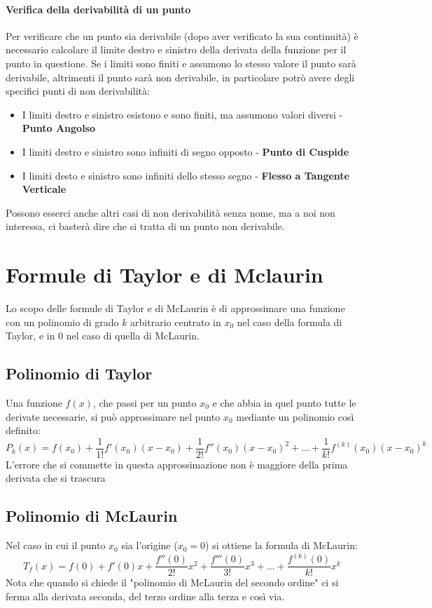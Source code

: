 \paragraph*{Verifica della derivabilità di un punto} Per verificare che un punto sia derivabile 
(dopo aver verificato la sua continuità) è necessario calcolare il limite destro e sinistro della derivata della funzione per il punto in questione.
Se i limiti sono finiti e assumono lo stesso valore il punto sarà derivabile, altrimenti il punto sarà non derivabile, in particolare potrò avere
degli specifici punti di non derivabilità:
\begin{itemize}
	\item I limiti destro e sinistro esistono e sono finiti, ma assumono valori diversi - \textbf{Punto Angolso}
	\item I limiti destro e sinistro sono infiniti di segno opposto - \textbf{Punto di Cuspide}
	\item I limiti desto e sinistro sono infiniti dello stesso segno - \textbf{Flesso a Tangente Verticale}
\end{itemize}
Possono esserci anche altri casi di non derivabilità senza nome, ma a noi non interessa, ci basterà dire che si tratta di un punto non derivabile.

\section{Formule di Taylor e di Mclaurin}
Lo scopo delle formule di Taylor e di McLaurin è di approssimare una funzione con un polinomio di grado $k$ arbitrario centrato in $x_0$ nel caso della formula di Taylor,
e in 0 nel caso di quella di McLaurin.
\subsection*{Polinomio di Taylor}
Una funzione $f(x)$, che passi per un punto $x_0$ e che abbia in quel punto tutte le derivate necessarie,
si può approssimare nel punto $x_0$ mediante un polinomio così definito:
$$P_k(x)=f(x_0)+\frac{1}{1!}f'(x_0)(x-x_0) + \frac{1}{2!}f''(x_0)(x-x_0)^2 +... + \frac{1}{k!}f^{(k)}(x_0)(x-x_0)^k$$
L'errore che si commette in questa approssimazione non è maggiore della prima derivata che si trascura
\subsection*{Polinomio di McLaurin}
Nel caso in cui il punto $x_0$ sia l'origine ($x_0=0$) si ottiene la formula di McLaurin:
$$T_f(x) = f(0) + f'(0)x + \frac{f''(0)}{2!}x^2 + \frac{f'''(0)}{3!}x^3+...+ \frac{f^{(k)}(0)}{k!}x^k$$
Nota che quando si chiede il "polinomio di McLaurin del secondo ordine" ci si ferma alla derivata seconda, del terzo ordine alla terza e così via.
